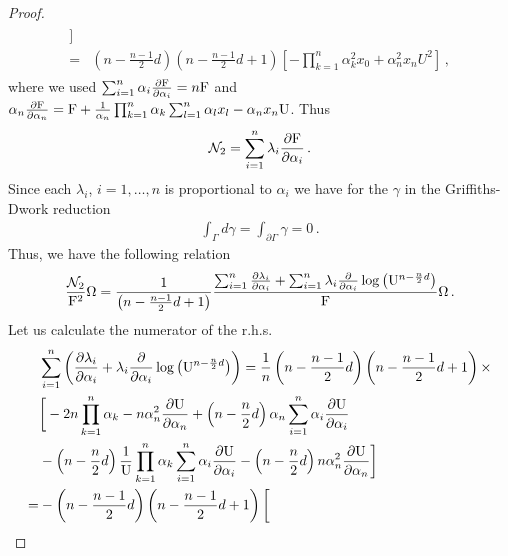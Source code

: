 \documentclass[11pt]{article}
\begin{document}
\begin{proof}
\begin{align}
\begin{split}
\bigg]  \\
=&\left(  n - \frac{n-1}{2}d \right) \left(  n - \frac{n-1}{2}d +1 \right) \left[  
-\prod_{k=1}^{n}\alpha_{k}^{2} x_{0} +\alpha_{n}^{2} x_{n} U^{2}
\right] \,,
\end{split}
\end{align}
where we used $\sum_{i=1}^{n}\alpha_{i} \frac{\partial {\rm F}}{\partial \alpha_{i}} = n {\rm F}$ and $\alpha_{n} \frac{\partial {\rm F}}{\partial \alpha_{n}} = {\rm F} +\frac{1}{\alpha_{n}}\prod_{k=1}^{n}\alpha_{k}\sum_{l=1}^{n}\alpha_{l}x_{l} -\alpha_{n}x_{n} {\rm U}$. Thus
\begin{align}
\mathcal{N}_{2} =  \sum_{i=1}^{n} \lambda_{i} \frac{\partial {\rm F}}{\partial \alpha_{i}} \,.   
\end{align}
Since each $\lambda_{i}$, $i=1, \hdots , n$ is proportional to $\alpha_{i}$ we have for the $\gamma$ in the Griffiths-Dwork reduction
\begin{align}
\int_{\Gamma} d \gamma = \int_{\partial \Gamma} \gamma = 0 \,.    
\end{align}
Thus, we have the following relation
\begin{align}
\frac{\mathcal{N}_{2}}{{\rm F}^{2}} \Omega = \frac{1}{\left( n -\frac{n-1}{2}d +1 \right)} \frac{\sum_{i=1}^{n}\frac{\partial \lambda_{i}}{\partial \alpha_{i}} + \sum_{i=1}^{n} \lambda_{i} \frac{\partial}{\partial \alpha_{i}} \log\left( {\rm U}^{n - \frac{n}{2}d}\right)}{{\rm F}}\Omega \,.   
\end{align}
Let us calculate the numerator of the r.h.s.
\begin{align}
\begin{split}
&\sum_{i=1}^{n} \left( \frac{\partial \lambda_{i}}{\partial \alpha_{i}} + \lambda_{i} \frac{\partial}{\partial \alpha_{i}} \log\left( {\rm U}^{n - \frac{n}{2}d}\right) \right) = \frac{1}{n}\left( n -\frac{n-1}{2}d \right) \left( n -\frac{n-1}{2}d +1 \right) \times \\
&\bigg[  
-2n\prod_{k=1}^{n}\alpha_{k} -n\alpha_{n}^{2}\frac{\partial {\rm U}}{\partial \alpha_{n}} + \left( n -\frac{n}{2}d \right)\alpha_{n}\sum_{i=1}^{n} \alpha_{i} \frac{\partial {\rm U}}{\partial \alpha_{i}} \\
&- \left( n -\frac{n}{2}d \right)\frac{1}{{\rm U}}\prod_{k=1}^{n} \alpha_{k} \sum_{i=1}^{n} \alpha_{i} \frac{\partial {\rm U}}{\partial \alpha_{i}} - \left( n -\frac{n}{2}d \right) n \alpha_{n}^{2} \frac{\partial {\rm U}}{\partial \alpha_{n}}
\bigg]  \\=
&-\left( n -\frac{n-1}{2}d \right) \left( n -\frac{n-1}{2}d +1 \right) \bigg[

\end{split}
\end{align}
\end{proof}
\end{document}
